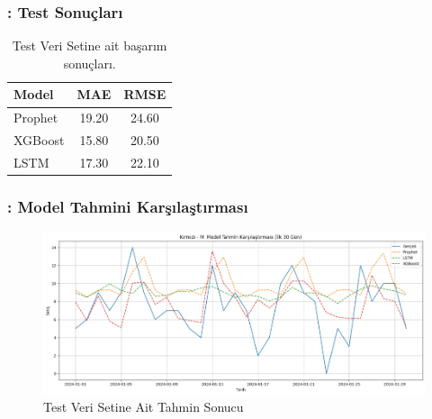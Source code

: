 \documentclass[12pt]{beamer}
\begin{document}
	
	
	\begin{frame}
		\frametitle{\insertsection: Test Sonuçları}
		\begin{table}
			\centering
			\small
			\begin{tabular}{l c c}
				\toprule
				\textbf{Model} & \textbf{MAE} & \textbf{RMSE}    \\
				\midrule
				Prophet        & 19.20     & 24.60 \\
				XGBoost        & 15.80     & 20.50 \\
				LSTM           & 17.30     & 22.10 \\
				\bottomrule
			\end{tabular}
			\caption{\small Test Veri Setine ait başarım sonuçları.}
		\end{table}
	\end{frame}
	
	
	
	\begin{frame}
		\frametitle{\insertsection: Model Tahmini Karşılaştırması}
		\begin{figure}
			\centering
			\includegraphics[width=0.75\linewidth]{figures/models_forcasting_results_v2.png}
			{\small \caption {Test Veri Setine Ait Tahmin Sonucu}}
		\end{figure}
	\end{frame}
	
	
\end{document}
